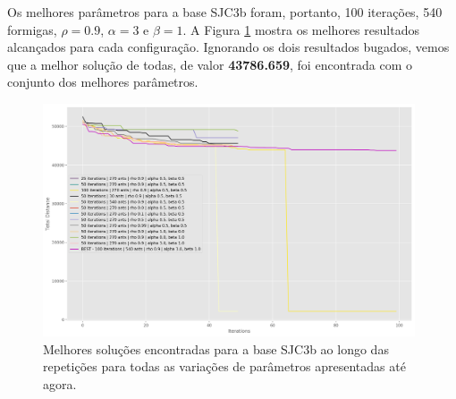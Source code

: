 Os melhores parâmetros para a base SJC3b foram, portanto, 100 iterações, 540 formigas, $\rho = 0.9$, $\alpha=3$ e $\beta=1$. A Figura \ref{fig:sjc3b_best} mostra os melhores resultados alcançados para cada configuração. Ignorando os dois resultados bugados, vemos que a melhor solução de todas, de valor \textbf{43786.659}, foi encontrada com o conjunto dos melhores parâmetros.

\begin{figure}[h]	
  \centering
  \includegraphics[width=11cm,keepaspectratio]{images/SJC3b_best.png}
  \caption{Melhores soluções encontradas para a base SJC3b ao longo das repetições para todas as variações de parâmetros apresentadas até agora.}
  \label{fig:sjc3b_best}
\end{figure}